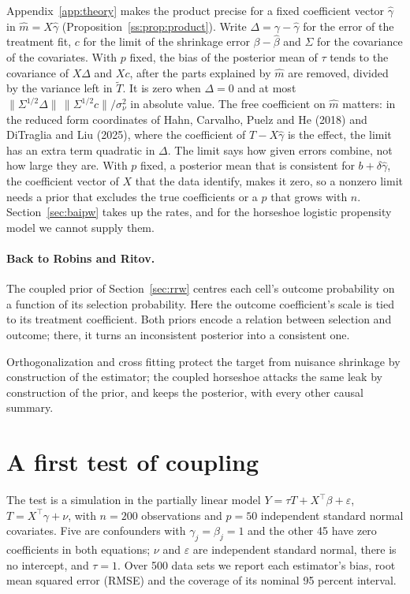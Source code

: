 Appendix~\ref{app:theory} makes the product precise for a fixed coefficient vector $\hat\gamma$ in $\hat m = X\hat\gamma$ (Proposition~\ref{ss:prop:product}). Write $\Delta = \gamma - \hat\gamma$ for the error of the treatment fit, $c$ for the limit of the shrinkage error $\beta - \hat\beta$ and $\Sigma$ for the covariance of the covariates. With $p$ fixed, the bias of the posterior mean of $\tau$ tends to the covariance of $X\Delta$ and $Xc$, after the parts explained by $\hat m$ are removed, divided by the variance left in $\tilde T$. It is zero when $\Delta = 0$ and at most $\|\Sigma^{1/2}\Delta\|\,\|\Sigma^{1/2}c\|/\sigma_\nu^2$ in absolute value. The free coefficient on $\hat m$ matters: in the reduced form coordinates of Hahn, Carvalho, Puelz and He (2018) and DiTraglia and Liu (2025), where the coefficient of $T - X\hat\gamma$ is the effect, the limit has an extra term quadratic in $\Delta$. The limit says how given errors combine, not how large they are. With $p$ fixed, a posterior mean that is consistent for $b + \delta\hat\gamma$, the coefficient vector of $X$ that the data identify, makes it zero, so a nonzero limit needs a prior that excludes the true coefficients or a $p$ that grows with $n$. Section~\ref{sec:baipw} takes up the rates, and for the horseshoe logistic propensity model we cannot supply them.



\paragraph{Back to Robins and Ritov.}
The coupled prior of Section~\ref{sec:rrw} centres each cell's outcome probability on a function of its selection probability. Here the outcome coefficient's scale is tied to its treatment coefficient. Both priors encode a relation between selection and outcome; there, it turns an inconsistent posterior into a consistent one.

Orthogonalization and cross fitting protect the target from nuisance shrinkage by construction of the estimator; the coupled horseshoe attacks the same leak by construction of the prior, and keeps the posterior, with every other causal summary.

\section{A first test of coupling}\label{sec:ricsim}

The test is a simulation in the partially linear model $Y = \tau T + X^\top\beta + \varepsilon$, $T = X^\top\gamma + \nu$, with $n = 200$ observations and $p = 50$ independent standard normal covariates. Five are confounders with $\gamma_j = \beta_j = 1$ and the other 45 have zero coefficients in both equations; $\nu$ and $\varepsilon$ are independent standard normal, there is no intercept, and $\tau = 1$. Over 500 data sets we report each estimator's bias, root mean squared error (RMSE) and the coverage of its nominal 95 percent interval.

